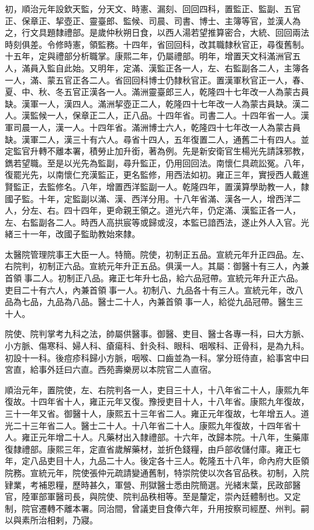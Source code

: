 \begin{pinyinscope}
初，順治元年設欽天監，分天文、時憲、漏刻、回回四科，置監正、監副、五官正、保章正、挈壺正、靈臺郎、監候、司晨、司書、博士、主簿等官，並漢人為之，行文具題隸禮部。是歲仲秋朔日食，以西人湯若望推算密合，大統、回回兩法時刻俱差。令修時憲，領監務。十四年，省回回科，改其職隸秋官正，尋復舊制。十五年，定與禮部分析職掌。康熙二年，仍屬禮部。明年，增置天文科滿洲官五人，滿員入監自此始。又明年，定滿、漢監正各一人，左、右監副各二人，主簿各一人，滿、蒙五官正各二人。省回回科博士仍隸秋官正。置漢軍秋官正一人，春、夏、中、秋、冬五官正漢各一人。滿洲靈臺郎三人，乾隆四十七年改一人為蒙古員缺。漢軍一人，漢四人。滿洲挈壺正二人，乾隆四十七年改一人為蒙古員缺。漢二人。漢監候一人，保章正二人，正八品。十四年省。司書二人。十四年省一人。漢軍司晨一人，漢一人。十四年省。滿洲博士六人，乾隆四十七年改一人為蒙古員缺。漢軍二人，漢三十有六人。尋省十四人，五年復置二人，通舊二十有四人。並定監官升轉不離本署，積勞止加升銜，著為例。先是新安衛官生楊光先請誅邪教，鐫若望職。至是以光先為監副，尋升監正，仍用回回法。南懷仁具疏訟冤。八年，復罷光先，以南懷仁充漢監正，更名監修，用西法如初。雍正三年，實授西人戴進賢監正，去監修名。八年，增置西洋監副一人。乾隆四年，置漢算學助教一人，隸國子監。十年，定監副以滿、漢、西洋分用。十八年省滿、漢各一人，增西洋二人，分左、右。四十四年，更命親王領之。道光六年，仍定滿、漢監正各一人，左、右監副各二人。時西人高拱宸等或歸或沒，本監已諳西法，遂止外人入官。光緒三十一年，改國子監助教始來隸。

太醫院管理院事王大臣一人。特簡。院使，初制正五品。宣統元年升正四品。左、右院判，初制正六品。宣統元年升正五品。俱漢一人。其屬：御醫十有三人，內兼首領事二人。初制正八品。雍正七年升七品，給六品冠帶。宣統元年升正六品。吏目二十有六人，內兼首領事一人。初制八、九品各十有三人。宣統元年，改八品為七品，九品為八品。醫士二十人，內兼首領事一人，給從九品冠帶。醫生三十人。

院使、院判掌考九科之法，帥屬供醫事。御醫、吏目、醫士各專一科，曰大方脈、小方脈、傷寒科、婦人科、瘡瘍科、針灸科、眼科、咽喉科、正骨科，是為九科。初設十一科。後痘疹科歸小方脈，咽喉、口齒並為一科。掌分班侍直，給事宮中曰宮直，給事外廷曰六直。西苑壽樂房以本院官二人直宿。

順治元年，置院使，左、右院判各一人，吏目三十人，十八年省二十人，康熙九年復故。十四年省十人，雍正元年又復。豫授吏目十人，十八年省。康熙九年復故，三十一年又省。御醫十人，康熙五十三年省二人。雍正元年復故，七年增五人。道光二十三年省二人。醫士二十人。十八年省二十人。康熙九年復故，十四年省十人。雍正元年增二十人。凡藥材出入隸禮部。十六年，改歸本院。十八年，生藥庫復隸禮部。康熙三年，定直省歲解藥材，並折色錢糧，由戶部收儲付庫。雍正七年，定八品吏目十人，九品二十人。後定各十三人。乾隆五十八年，命內府大臣領院務。宣統元年，院使張仲元疏請變通舊制，特崇院使以次各官品秩。初制，入院肄業，考補恩糧，歷時甚久，軍營、刑獄醫士悉由院簡選。光緒末葉，民政部醫官，陸軍部軍醫司長，與院使、院判品秩相等。至是釐定，崇內廷體制也。又定制，院官遷轉不離本署。同治間，曾議吏目食俸六年，升用按察司經歷、州判。嗣以與素所治相剌，乃寢。


\end{pinyinscope}
